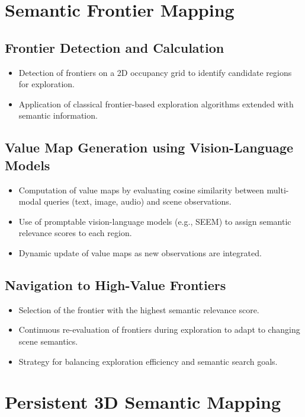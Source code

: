\section{Semantic Frontier Mapping}
\subsection{Frontier Detection and Calculation}
\begin{itemize}
    \item Detection of frontiers on a 2D occupancy grid to identify candidate regions for exploration.
    \item Application of classical frontier-based exploration algorithms extended with semantic information.
\end{itemize}

\subsection{Value Map Generation using Vision-Language Models}
\begin{itemize}
    \item Computation of value maps by evaluating cosine similarity between multi-modal queries (text, image, audio) and scene observations.
    \item Use of promptable vision-language models (e.g., SEEM) to assign semantic relevance scores to each region.
    \item Dynamic update of value maps as new observations are integrated.
\end{itemize}

\subsection{Navigation to High-Value Frontiers}
\begin{itemize}
    \item Selection of the frontier with the highest semantic relevance score.
    \item Continuous re-evaluation of frontiers during exploration to adapt to changing scene semantics.
    \item Strategy for balancing exploration efficiency and semantic search goals.
\end{itemize}

\section{Persistent 3D Semantic Mapping}

